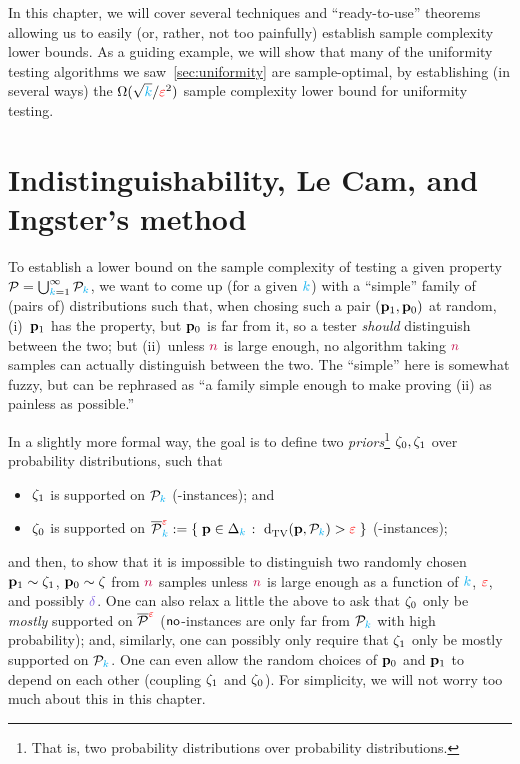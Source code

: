 In this chapter, we will cover several techniques and ``ready-to-use'' theorems allowing us to easily (or, rather, not too painfully) establish sample complexity lower bounds. As a guiding example, we will show that many of the uniformity testing algorithms we saw~\cref{sec:uniformity} are sample-optimal, by establishing (in several ways) the $\Omega(\sqrt{{\textcolor{cyan}{k}}}/\textcolor{red}{\varepsilon}^2)$ sample complexity lower bound for uniformity testing.

\section{Indistinguishability, Le Cam, and Ingster's method}
	\label{ssec:ingster}

To establish a lower bound on the sample complexity of testing a given property $\mathcal{P} = \bigcup_{{\textcolor{cyan}{k}}=1}^\infty \mathcal{P}_{\textcolor{cyan}{k}}$, we want to come up (for a given ${\textcolor{cyan}{k}}$) with a ``simple'' family of (pairs of) distributions such that, when chosing such a pair $(\mathbf{p}_1, \mathbf{p}_0)$ at random, (i)~$\mathbf{p}_1$ has the property, but $\mathbf{p}_0$ is far from it, so a tester \emph{should} distinguish between the two; but (ii)~unless ${\textcolor{purple}{n}}$ is large enough, no algorithm taking ${\textcolor{purple}{n}}$ samples can actually distinguish between the two. The ``simple'' here is somewhat fuzzy, but can be rephrased as ``a family simple enough to make proving (ii) as painless as possible.''

In a slightly more formal way, the goal is to define two \emph{priors}\footnote{That is, two probability distributions over probability distributions.} $\zeta_0,\zeta_1$ over probability distributions, such that
\begin{itemize}
	\item $\zeta_1$ is supported on $\mathcal{P}_{\textcolor{cyan}{k}}$ (\yes-instances); and
	\item $\zeta_0$ is supported on $\overline{\property}^{\dst}_\ab \eqdef \setOfSuchThat{\p\in\distribs{\ab}}{\totalvardist{\p}{\property_\ab}>\dst}$ (\no-instances);
\end{itemize}
and then, to show that it is impossible to distinguish two randomly chosen $\mathbf{p}_1\sim \zeta_1$, $\mathbf{p}_0\sim \zeta$ from ${\textcolor{purple}{n}}$ samples unless ${\textcolor{purple}{n}}$ is large enough as a function of ${\textcolor{cyan}{k}}$, $\textcolor{red}{\varepsilon}$, and possibly $\errprob$. One can also relax a little the above to ask that $\zeta_0$ only be \emph{mostly} supported on $\overline{\mathcal{P}}^{\textcolor{red}{\varepsilon}}$ (\ie ${\sf{}no}$-instances are only far from $\mathcal{P}_{\textcolor{cyan}{k}}$ with high probability); and, similarly, one can possibly only require that $\zeta_1$ only be mostly supported on $\mathcal{P}_{\textcolor{cyan}{k}}$. One can even allow the random choices of $\mathbf{p}_0$ and $\mathbf{p}_1$ to depend on each other (\ie coupling $\zeta_1$ and $\zeta_0$). For simplicity, we will not worry too much about this in this chapter.\medskip

